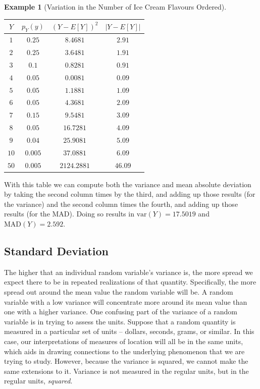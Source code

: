 \documentclass[
  letterpaper,
  DIV=11,
  numbers=noendperiod]{scrreprt}
\theoremstyle{definition}
\theoremstyle{definition}
\newtheorem{example}{Example}[chapter]
\theoremstyle{definition}
\theoremstyle{remark}
\begin{document}
\begin{example}[Variation in the Number of Ice Cream Flavours
Ordered]
\begin{tcolorbox}[enhanced jigsaw, colback=white, colframe=quarto-callout-color-frame, arc=.35mm, leftrule=.75mm, rightrule=.15mm, opacityback=0, breakable, bottomrule=.15mm, left=2mm, toprule=.15mm]
\begin{longtable}[]{@{}cccc@{}}
\toprule\noalign{}
\(Y\) & \(p_Y(y)\) & \((Y - E[Y])^2\) & \(|Y - E[Y]|\) \\
\midrule\noalign{}
\endhead
\bottomrule\noalign{}
\endlastfoot
\(1\) & \(0.25\) & \(8.4681\) & \(2.91\) \\
\(2\) & \(0.25\) & \(3.6481\) & \(1.91\) \\
\(3\) & \(0.1\) & \(0.8281\) & \(0.91\) \\
\(4\) & \(0.05\) & \(0.0081\) & \(0.09\) \\
\(5\) & \(0.05\) & \(1.1881\) & \(1.09\) \\
\(6\) & \(0.05\) & \(4.3681\) & \(2.09\) \\
\(7\) & \(0.15\) & \(9.5481\) & \(3.09\) \\
\(8\) & \(0.05\) & \(16.7281\) & \(4.09\) \\
\(9\) & \(0.04\) & \(25.9081\) & \(5.09\) \\
\(10\) & \(0.005\) & \(37.0881\) & \(6.09\) \\
\(50\) & \(0.005\) & \(2124.2881\) & \(46.09\) \\
\end{longtable}

With this table we can compute both the variance and mean absolute
deviation by taking the second column times by the third, and adding up
those results (for the variance) and the second column times the fourth,
and adding up those results (for the MAD). Doing so results in
\(\text{var}(Y) = 17.5019\) and \(\text{MAD}(Y) = 2.592\).

\end{tcolorbox}

\end{example}

\subsection{Standard Deviation}\label{standard-deviation}

The higher that an individual random variable's variance is, the more
spread we expect there to be in repeated realizations of that quantity.
Specifically, the more spread out around the mean value the random
variable will be. A random variable with a low variance will concentrate
more around its mean value than one with a higher variance. One
confusing part of the variance of a random variable is in trying to
assess the units. Suppose that a random quantity is measured in a
particular set of units -- dollars, seconds, grams, or similar. In this
case, our interpretations of measures of location will all be in the
same units, which aids in drawing connections to the underlying
phenomenon that we are trying to study. However, because the variance is
squared, we cannot make the same extensions to it. Variance is not
measured in the regular units, but in the regular units, \emph{squared}.
\end{document}

